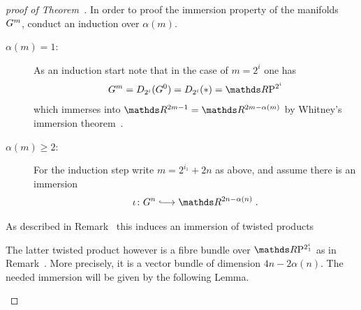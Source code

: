   \begin{proof}[proof of
    Theorem~]
    In order to proof the immersion property of the manifolds $G^{m}$,
    conduct an induction over $\alpha(m)$.
    \begin{description}
    \item[$\alpha(m)=1$:]
      As an induction start note that in the case of $m=2^i$ one has
      \begin{gather*}
        \G m
        =\Twistedprod{2^i}{\G 0}
        =\Twistedprod{2^i}{\pt}
        =\RP{2^i}
      \end{gather*}
      which immerses into $\R^{2m-1}=\R^{2m-\alpha(m)}$ by
      Whitney's immersion theorem~\cite{whitneyimmersiontheorem}.
    \item[$\alpha(m)\geq2$:]
      For the induction step write $m=2^{i_1}+2n$ as above, and assume
      there is an immersion
      \begin{gather*}
        \iota\colon\G n \immlongto \R^{2n-\alpha(n)}
        \;.
      \end{gather*}
    \end{description}
    As described in
    Remark~
    this induces an immersion of twisted products
    \begin{center}
    \end{center}
    The latter twisted product however is a fibre bundle over
    $\RP{2^i_1}$ as in
    Remark~.
    More precisely, it is a vector bundle of dimension $4n-2\alpha(n)$.
    The needed immersion will be given by the following Lemma.
    \begin{Lem}\label{lem:immersionvbtotalspaces}

\end{Lem}
\end{proof}
